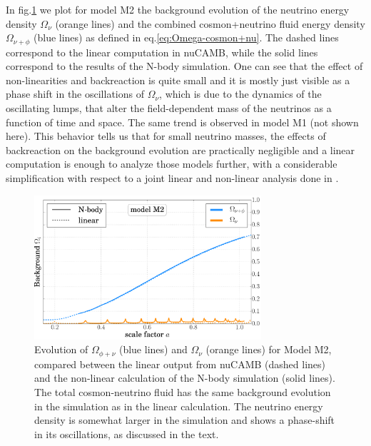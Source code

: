 In fig.\ref{fig:bckg-mod2-1} we plot for model M2 the background
evolution of the neutrino energy density $\Omega_{\nu}$ (orange lines)
and the combined cosmon+neutrino fluid energy density $\Omega_{\nu+\phi}$
(blue lines) as defined in eq.\ref{eq:Omega-cosmon+nu}. The
dashed lines correspond to the linear computation in nuCAMB, while
the solid lines correspond to the results of the N-body simulation.
One can see that the effect of non-linearities and backreaction is
quite small and it is mostly just visible as a phase shift in the
oscillations of $\Omega_{\nu}$, which is due to the dynamics of the
oscillating lumps, that alter the field-dependent mass of the neutrinos
as a function of time and space. The same trend is observed in model
M1 (not shown here). This behavior tells us that for small neutrino
masses, the effects of backreaction on the background evolution are
practically negligible and a linear computation is enough to analyze
those models further, with a considerable simplification with respect
to a joint linear and non-linear analysis done in \cite{pettorino_neutrino_2010}.

\begin{figure}
\centering{}\includegraphics[width=0.75\textwidth]{Chapters/gnq/figures/Background-model2-gnq-And-CAMB_OmegaFluidQNu-and-OmegaNu-v1}
\caption[Evolution of $\Omega_{\phi+\nu}$
and $\Omega_{\nu}$ for Model M2 in GNQ.]{\label{fig:bckg-mod2-1}Evolution of $\Omega_{\phi+\nu}$ (blue lines)
and $\Omega_{\nu}$ (orange lines) for Model M2, compared between
the linear output from nuCAMB (dashed lines) and the non-linear calculation
of the N-body simulation (solid lines). The total cosmon-neutrino
fluid has the same background evolution in the simulation as in the
linear calculation. The neutrino energy density is somewhat larger
in the simulation and shows a phase-shift in its oscillations, as
discussed in the text.}
\end{figure}


